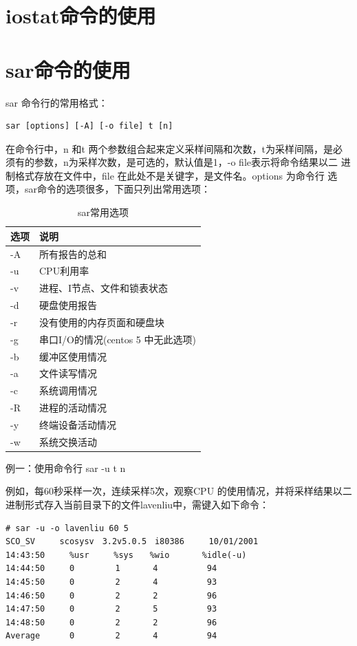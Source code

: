 \section{iostat命令的使用}
\label{sec:iostatCmd}

\section{sar命令的使用}
\label{sec:sarCmd}

sar 命令行的常用格式：
\begin{verbatim}
sar [options] [-A] [-o file] t [n]
\end{verbatim}

在命令行中，n 和t 两个参数组合起来定义采样间隔和次数，t为采样间隔，是必
须有的参数，n为采样次数，是可选的，默认值是1，-o file表示将命令结果以二
进制格式存放在文件中，file 在此处不是关键字，是文件名。options 为命令行
选项，sar命令的选项很多，下面只列出常用选项：

\begin{table}[!htbp]
  \centering
  \begin{tabular}{ll}
    \toprule
    选项     & 说明 \\
    \midrule
    -A  & 所有报告的总和 \\
    -u  & CPU利用率 \\
    -v  & 进程、I节点、文件和锁表状态 \\
    -d  & 硬盘使用报告 \\
    -r  & 没有使用的内存页面和硬盘块 \\
    -g  & 串口I/O的情况(centos 5 中无此选项) \\
    -b  & 缓冲区使用情况 \\
    -a  & 文件读写情况 \\
    -c  & 系统调用情况 \\
    -R  & 进程的活动情况 \\
    -y  & 终端设备活动情况 \\
    -w  & 系统交换活动 \\
    \bottomrule
  \end{tabular}
  \caption{sar常用选项}
  \label{tab:sarOptions}
\end{table}

例一：使用命令行 sar -u t n

例如，每60秒采样一次，连续采样5次，观察CPU 的使用情况，并将采样结果以二
进制形式存入当前目录下的文件lavenliu中，需键入如下命令：

\begin{verbatim}
# sar -u -o lavenliu 60 5
SCO_SV　　　scosysv　3.2v5.0.5　i80386　　　10/01/2001
14:43:50　　　%usr　　　%sys　　%wio　　　　%idle(-u)
14:44:50　　　0　　　　　1　　　　4　　　　　　94
14:45:50　　　0　　　　　2　　　　4　　　　　　93
14:46:50　　　0　　　　　2　　　　2　　　　　　96
14:47:50　　　0　　　　　2　　　　5　　　　　　93
14:48:50　　　0　　　　　2　　　　2　　　　　　96
Average　　　 0　　　　　2　　　　4　　　　　　94
\end{verbatim}

